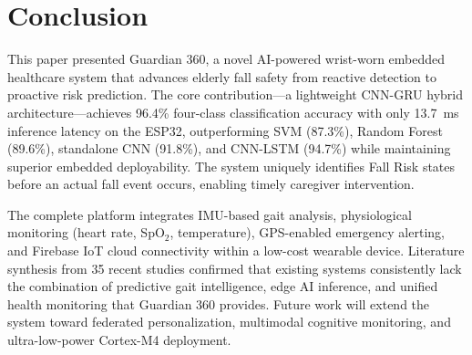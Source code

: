 \documentclass[conference]{IEEEtran}
\begin{document}
\section{Conclusion}

This paper presented Guardian 360, a novel AI-powered wrist-worn embedded healthcare system that advances elderly fall safety from reactive detection to proactive risk prediction. The core contribution---a lightweight CNN-GRU hybrid architecture---achieves 96.4\% four-class classification accuracy with only 13.7~ms inference latency on the ESP32, outperforming SVM \cite{b4} (87.3\%), Random Forest \cite{b34} (89.6\%), standalone CNN \cite{b33} (91.8\%), and CNN-LSTM \cite{b5} (94.7\%) while maintaining superior embedded deployability. The system uniquely identifies Fall Risk states before an actual fall event occurs, enabling timely caregiver intervention.

The complete platform integrates IMU-based gait analysis, physiological monitoring (heart rate, SpO$_2$, temperature), GPS-enabled emergency alerting, and Firebase IoT cloud connectivity within a low-cost wearable device. Literature synthesis from 35 recent studies confirmed that existing systems consistently lack the combination of predictive gait intelligence, edge AI inference, and unified health monitoring that Guardian 360 provides. Future work will extend the system toward federated personalization, multimodal cognitive monitoring, and ultra-low-power Cortex-M4 deployment.
\end{document}
